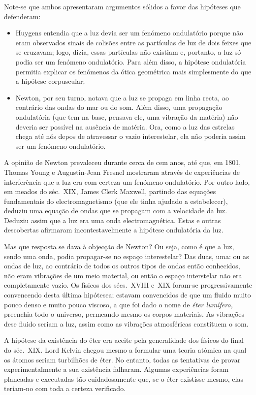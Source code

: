 Note-se
que ambos apresentaram argumentos sólidos a favor das hipóteses que defenderam:
\begin{itemize}
\item
    Huygens entendia que a luz devia ser um fenómeno ondulatório porque não eram
    observados sinais de colisões entre as partículas de luz de dois feixes que
    se cruzavam; logo, dizia, essas partículas não existiam e, portanto, a luz
    só podia ser um fenómeno ondulatório. Para além disso, a hipótese
    ondulatória permitia explicar os fenómenos da ótica geométrica mais
    simplesmente do que a hipótese corpuscular;
\item
    Newton, por seu turno, notava que a luz se propaga em linha recta, ao
    contrário das ondas do mar ou do som. Além disso, uma propagação
    ondulatória (que tem na base, pensava ele, uma vibração da matéria) não
    deveria ser possível na ausência de matéria. Ora, como a luz das estrelas
    chega até nós depos de atravessar o vazio interestelar, ela não poderia
    assim ser um fenómeno ondulatório.
\end{itemize}
A opinião de Newton prevaleceu durante cerca de cem anos, até que, em 1801,
Thomas Young e Augustin-Jean Fresnel mostraram através de experiências de
interferência que a luz era com certeza um fenómeno ondulatório. Por outro
lado, em meados do séc.~XIX, James Clerk Maxwell, partindo das equações
fundamentais do electromagnetismo (que ele tinha ajudado a estabelecer), deduziu
uma equação de ondas que se propagam com a velocidade da luz. Deduziu assim que
a luz era uma onda electromagnética. Estas e outras descobertas afirmaram
incontestavelmente a hipótese ondulatória da luz.

Mas que resposta se dava à objecção de Newton? Ou seja, como é que a luz, sendo
uma onda, podia propagar-se no espaço interestelar? Das duas, uma: ou as ondas
de luz, ao contrário de todos os outros tipos de ondas então conhecidos, não
eram vibrações de um meio material, ou então o espaço interstelar não era
completamente vazio.  Os físicos dos sécs.~XVIII e~XIX foram-se progressivamente
convencendo desta última hipótesea; estavam convencidos  de que um fluido muito
pouco denso e muito pouco viscoso, a que foi dado o nome de \emph{éter
lumífero,} preenchia todo o universo, permeando mesmo os corpos materiais. As
vibrações dese fluido seriam a luz, assim como as vibrações atmosféricas
constituem o som. 

A hipótese da existência do éter era aceite pela generalidade dos físicos do
final do séc.~XIX. Lord Kelvin chegou mesmo a formular uma teoria atómica na
qual os átomos seriam turbilhões de éter. No entanto, todas as tentativas de
provar experimentalmente a sua existência falharam. Algumas experiências foram
planeadas e executadas tão cuidadosamente que, se o éter existisse mesmo, elas
teriam-no com toda a certeza verificado.

